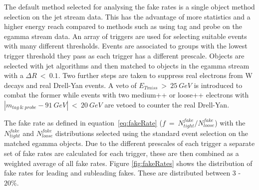 The default method selected for analysing the fake rates is a single object method selection on the jet stream data. This has the advantage of more statistics and a higher energy reach compared to methods such as using tag and probe on the egamma stream data.
An array of triggers are used for selecting suitable events with many different thresholds. 
Events are associated to groups with the lowest trigger threshold they pass as each trigger has a different prescale. Objects are selected with jet algorithms and then matched to objects in the egamma stream with a $\Delta R~<~0.1$. Two further steps are taken to suppress real electrons from W decays and real Drell-Yan events. A veto of $E_{Tmiss}~>~25~GeV$ is introduced to combat the former while events with two medium++ or loose++ electrons with $|m_{tag~\&~probe}-91~GeV|~<~20~GeV$ are vetoed to counter the real Drell-Yan.

The fake rate as defined in equation~\ref{eq:fakeRate} ($f~=~N^{fake}_{tight}/N^{fake}_{loose}$) with the $N^{fake}_{tight}$ and $N^{fake}_{loose}$ distributions selected using the standard event selection on the matched egamma objects.
Due to the different prescales of each trigger a separate set of fake rates are calculated for each trigger, these are then combined as a weighted average of all fake rates. Figure \ref{fig:fakeRates} shows the distribution of fake rates for leading and subleading fakes. These are distributed between 3 - $20\%$. %

